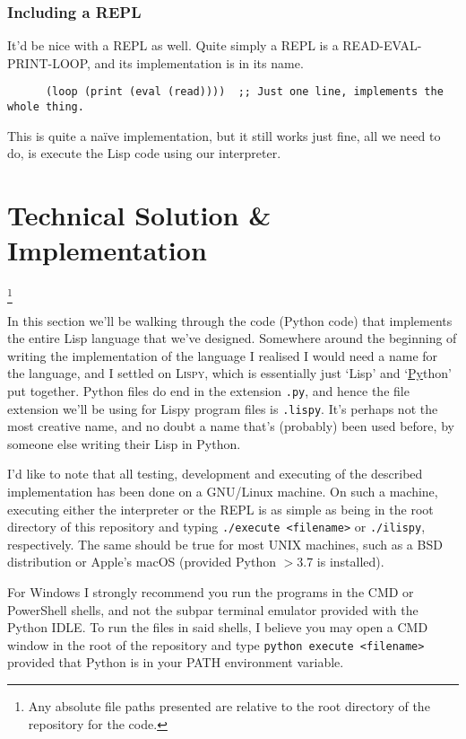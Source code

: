 \documentclass{article}
\newcommand{\code}[1]{\texttt{#1}}
\newcommand\blfootnote[1]{%
  \begingroup
  \renewcommand\thefootnote{}\footnote{#1}%
  \addtocounter{footnote}{-1}%
  \endgroup
}
\begin{document}
  \subsubsection{Including a REPL} \label{repl}
    It'd be nice with a REPL as well. Quite simply a REPL is a
    READ-EVAL-PRINT-LOOP, and its implementation is in its name.
    \begin{verbatim}
      (loop (print (eval (read))))  ;; Just one line, implements the whole thing.
    \end{verbatim}
    This is quite a na\"{i}ve implementation, but it still works just fine,
    all we need to do, is execute the Lisp code using our interpreter.

    \clearpage


\section{Technical Solution \& Implementation}
  \blfootnote{Any absolute file paths presented are relative to the root
  directory of the repository for the code.}
  In this section we'll be walking through the code (Python code) that
  implements the entire Lisp language that we've designed. Somewhere around
  the beginning of writing the implementation of the language I realised I would
  need a name for the language, and I settled on \textsc{Lispy}, which is
  essentially just `Lisp' and `\underline{Py}thon' put together. Python files
  do end in the extension \code{.py}, and hence the file extension we'll
  be using for Lispy program files is \code{.lispy}.  It's perhaps not the most
  creative name, and no doubt a name that's (probably) been used before, by someone else
  writing their Lisp in Python.

  I'd like to note that all testing, development and executing of the described
  implementation has been done on a GNU/Linux machine. On such a machine, executing
  either the interpreter or the REPL is as simple as being in the root directory
  of this repository and typing \code{./execute <filename>} or \code{./ilispy},
  respectively.  The same should be true for most UNIX machines, such as a
  BSD distribution or Apple's macOS (provided Python $>$3.7 is installed).

  For Windows I strongly recommend you run the programs in the CMD or PowerShell
  shells, and not the subpar terminal emulator provided with the Python IDLE.
  To run the files in said shells, I believe you may open a CMD window in the
  root of the repository and type \code{python execute <filename>} provided that
  Python is in your PATH environment variable.
\end{document}
